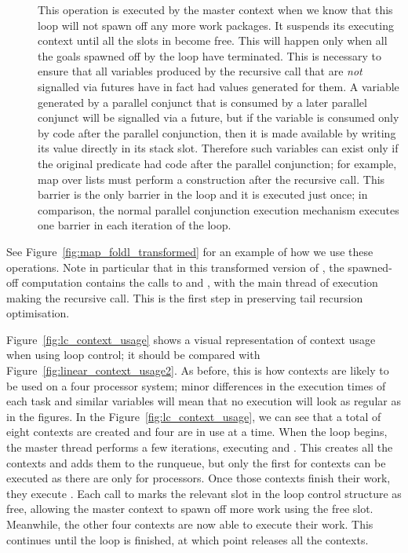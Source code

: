 \begin{description}
\item[]
This operation is executed by the master context when we know
that this loop will not spawn off any more work packages.
It suspends its executing context
until all the slots in \LC{} become free.
This will happen only when all the goals spawned off by the loop
have terminated.
This is necessary to ensure that
all variables produced by the recursive call
that are \emph{not} signalled via futures
have in fact had values generated for them.
A variable generated by a parallel conjunct
that is consumed by a later parallel conjunct will be signalled via a future,
but if the variable is consumed only by code after the parallel conjunction,
then it is made available by writing its value directly in its stack
slot.
Therefore such variables can exist
only if the original predicate had code after the parallel conjunction;
for example, map over lists
must perform a construction after the recursive call.
This barrier is the only barrier in the loop and it is executed just once;
in comparison, the normal parallel conjunction execution mechanism
executes one barrier in each iteration of the loop.
\end{description}


\noindent
See Figure~\ref{fig:map_foldl_transformed}
for an example of how we use these operations.
Note in particular that in this transformed version of \mapfoldl{},
the spawned-off computation contains the calls to  and ,
with the main thread of execution making the recursive call.
This is the first step in preserving tail recursion optimisation.



Figure~\ref{fig:lc_context_usage} shows a visual representation of context
usage when using loop control;
it should be compared with Figure~\ref{fig:linear_context_usage2}.
As before, this is how contexts are likely to be used on a four processor
system;
minor differences in the execution times of each task and similar variables
will mean that no execution will look as regular as in the figures.
In the Figure~\ref{fig:lc_context_usage},
we can see that a total of eight contexts are created and four are in use at
a time.
When the loop begins,
the master thread performs a few iterations, executing \lcwaitfreeslot and
\lcspawnoff.
This creates all the contexts and  adds them to the runqueue,
but only the first for contexts can be executed as there are only for
processors.
Once those contexts finish their work,
they execute \lcjoinandterminate.
Each call to \lcjoinandterminate marks the relevant slot in the loop control
structure as free,
allowing the master context to spawn off more work using the free slot.
Meanwhile, the other four contexts are now able to execute their work.
This continues until the loop is finished, at which point \lcfinish releases
all the contexts.

